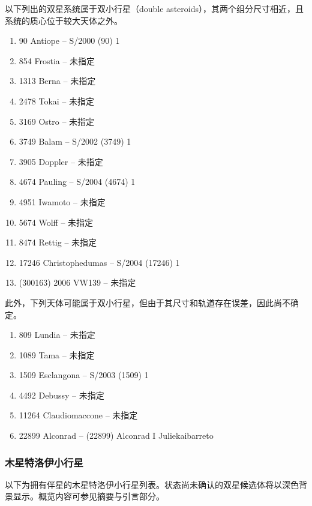 以下列出的双星系统属于双小行星（double asteroids），其两个组分尺寸相近，且系统的质心位于较大天体之外。
\begin{enumerate}
\item 90 Antiope – S/2000 (90) 1
\item 854 Frostia – 未指定
\item 1313 Berna – 未指定
\item 2478 Tokai – 未指定
\item 3169 Ostro – 未指定
\item 3749 Balam – S/2002 (3749) 1
\item 3905 Doppler – 未指定
\item 4674 Pauling – S/2004 (4674) 1
\item 4951 Iwamoto – 未指定
\item 5674 Wolff – 未指定
\item 8474 Rettig – 未指定
\item 17246 Christophedumas – S/2004 (17246) 1
\item (300163) 2006 VW139 – 未指定
\end{enumerate}
此外，下列天体可能属于双小行星，但由于其尺寸和轨道存在误差，因此尚不确定。
\begin{enumerate}
\item 809 Lundia – 未指定
\item 1089 Tama – 未指定
\item 1509 Esclangona – S/2003 (1509) 1
\item 4492 Debussy – 未指定
\item 11264 Claudiomaccone – 未指定
\item 22899 Alconrad – (22899) Alconrad I Juliekaibarreto
\end{enumerate}
\subsubsection{木星特洛伊小行星}
以下为拥有伴星的木星特洛伊小行星列表。状态尚未确认的双星候选体将以深色背景显示。概览内容可参见摘要与引言部分。


